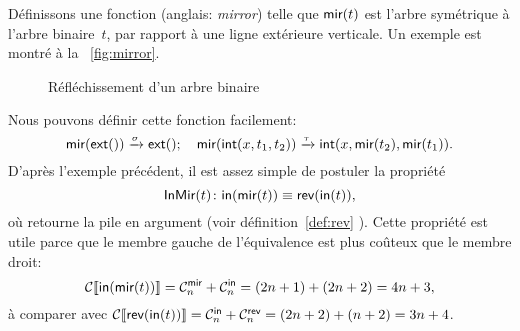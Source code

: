 Définissons une fonction  (anglais:
\emph{mirror}) telle que \(\fun{mir}(t)\) est l'arbre symétrique à
l'arbre binaire~\(t\), par rapport à une ligne extérieure
verticale. Un exemple est montré à la \fig~\vref{fig:mirror}.
\begin{figure}
\centering
\subfloat[\(t\)]{\texttt{[image: bt\_ex2]}}
\qquad
{}
\caption{Réfléchissement d'un arbre binaire}
\label{fig:mirror}
\end{figure}
Nous pouvons définir cette fonction facilement:
\begin{equation*}
\fun{mir}(\fun{ext}()) \xrightarrow{\smash{\sigma}} \fun{ext}();
\quad
\fun{mir}(\fun{int}(x,t_1,t_2)) \xrightarrow{\smash{\tau}}
\fun{int}(x,\fun{mir}(t_2),\fun{mir}(t_1)).
\end{equation*}
D'après l'exemple précédent, il est assez simple de postuler la
propriété
\begin{equation*}
\pred{InMir}{t} \colon \fun{in}(\fun{mir}(t)) \equiv
\fun{rev}(\fun{in}(t)),\index{InMir@\predName{InMir}}
\end{equation*}
où 
retourne la pile en argument (voir
définition~\eqref{def:rev} ). Cette propriété est
utile parce que le membre gauche de l'équivalence est plus coûteux que
le membre droit:
\begin{equation*}
  \Call{\fun{in}(\fun{mir}(t))} =
  \C{\fun{mir}}{n} + \C{\fun{in}}{n} = (2n+1) + (2n+2) = 4n + 3,
\end{equation*}
à comparer avec \(\Call{\fun{rev}(\fun{in}(t))} = \C{\fun{in}}{n} +
\C{\fun{rev}}{n} = (2n+2) + (n+2) = 3n +
4\).

